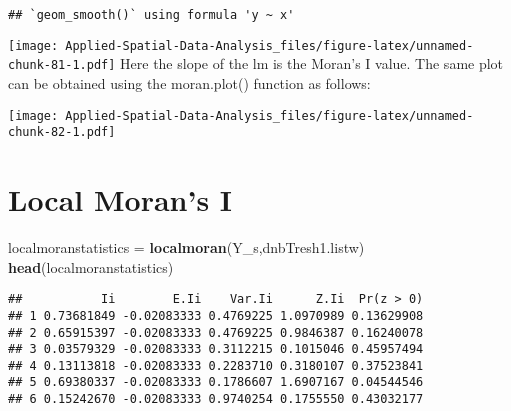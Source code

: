 \documentclass[
]{book}
\newenvironment{Shaded}{\begin{snugshade}}{\end{snugshade}}
\newcommand{\DecValTok}[1]{\textcolor[rgb]{0.00,0.00,0.81}{#1}}
\newcommand{\KeywordTok}[1]{\textcolor[rgb]{0.13,0.29,0.53}{\textbf{#1}}}
\newcommand{\NormalTok}[1]{#1}
\newcommand{\OperatorTok}[1]{\textcolor[rgb]{0.81,0.36,0.00}{\textbf{#1}}}
\newcommand{\StringTok}[1]{\textcolor[rgb]{0.31,0.60,0.02}{#1}}
\begin{document}
\begin{verbatim}
## `geom_smooth()` using formula 'y ~ x'
\end{verbatim}

\texttt{[image: Applied-Spatial-Data-Analysis\_files/figure-latex/unnamed-chunk-81-1.pdf]}
Here the slope of the lm is the Moran's I value. The same plot can be obtained using the moran.plot() function as follows:

\begin{Shaded}
\end{Shaded}

\texttt{[image: Applied-Spatial-Data-Analysis\_files/figure-latex/unnamed-chunk-82-1.pdf]}

\hypertarget{local-morans-i}{%
\section{Local Moran's I}\label{local-morans-i}}

\begin{Shaded}
\begin{Highlighting}[]
\NormalTok{localmoranstatistics =}\StringTok{ }\KeywordTok{localmoran}\NormalTok{(Y_s,dnbTresh1.listw)}
\KeywordTok{head}\NormalTok{(localmoranstatistics)}
\end{Highlighting}
\end{Shaded}

\begin{verbatim}
##           Ii        E.Ii    Var.Ii      Z.Ii  Pr(z > 0)
## 1 0.73681849 -0.02083333 0.4769225 1.0970989 0.13629908
## 2 0.65915397 -0.02083333 0.4769225 0.9846387 0.16240078
## 3 0.03579329 -0.02083333 0.3112215 0.1015046 0.45957494
## 4 0.13113818 -0.02083333 0.2283710 0.3180107 0.37523841
## 5 0.69380337 -0.02083333 0.1786607 1.6907167 0.04544546
## 6 0.15242670 -0.02083333 0.9740254 0.1755550 0.43032177
\end{verbatim}

\begin{Shaded}
\end{Shaded}
\end{document}
